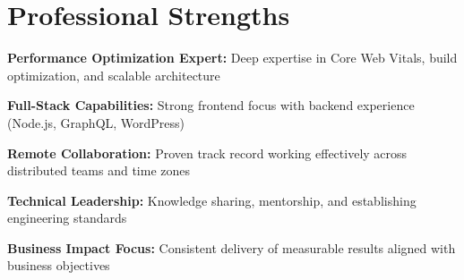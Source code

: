 \documentclass[a4paper, 11pt]{article}
\newcommand{\resumeSubHeadingListStart}{\begin{itemize}[leftmargin=0.1in, label={}]}
\newcommand{\resumeSubHeadingListEnd}{\end{itemize}\vspace{5pt}}
\begin{document}
\section{Professional Strengths}
    \resumeSubHeadingListStart
        \small{
            \item \textbf{Performance Optimization Expert:} Deep expertise in Core Web Vitals, build optimization, and scalable architecture
            \item \textbf{Full-Stack Capabilities:} Strong frontend focus with backend experience (Node.js, GraphQL, WordPress)
            \item \textbf{Remote Collaboration:} Proven track record working effectively across distributed teams and time zones
            \item \textbf{Technical Leadership:} Knowledge sharing, mentorship, and establishing engineering standards
            \item \textbf{Business Impact Focus:} Consistent delivery of measurable results aligned with business objectives
        }
    \resumeSubHeadingListEnd
\end{document}
